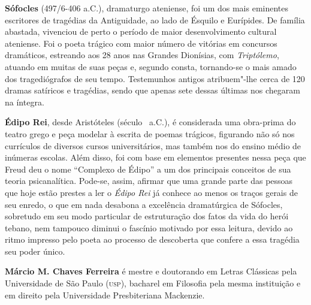 \textbf{Sófocles} (497/6-406 a.C.), dramaturgo ateniense, foi um dos mais eminentes 
escritores de tragédias da Antiguidade, ao lado de Ésquilo e Eurípides. De família abastada, vivenciou de perto 
o período de maior desenvolvimento cultural ateniense. Foi o poeta trágico com maior 
número de vitórias em concursos dramáticos, estreando aos 28 anos nas Grandes Dionísias, com \textit{Triptólemo}, 
atuando em muitas de suas peças e, segundo consta, tornando-se o mais amado dos tragediógrafos de seu tempo. 
Testemunhos antigos atribuem"-lhe cerca de 120 dramas satíricos e tragédias, sendo que apenas sete dessas últimas nos chegaram na íntegra. 


\textbf{Édipo Rei}, desde Aristóteles (século~ a.C.), é considerada uma
obra-prima do teatro grego e peça modelar à escrita de poemas trágicos, 
figurando não só nos currículos de diversos
cursos universitários, mas também nos do ensino médio de inúmeras
escolas. Além disso, foi com base em elementos presentes nessa
peça que Freud deu o nome ``Complexo de Édipo'' a um dos principais
conceitos de sua teoria psicanalítica. Pode-se, assim, afirmar que uma grande 
parte das pessoas que hoje estão prestes
a ler o \textit{Édipo Rei} já conhece ao menos os traços
gerais de seu enredo, o que em nada desabona a excelência dramatúrgica de Sófocles,
sobretudo em seu modo particular de estruturação dos fatos da vida do herói
tebano, nem tampouco diminui o fascínio motivado por essa leitura, 
devido ao ritmo impresso pelo poeta ao processo de descoberta que
confere a essa tragédia seu poder único.


\textbf{Márcio M. Chaves Ferreira} é mestre e doutorando em Letras Clássicas pela Universidade 
de São Paulo (\textsc{usp}), bacharel em Filosofia pela mesma instituição e em direito pela 
Universidade Presbiteriana Mackenzie.\par
